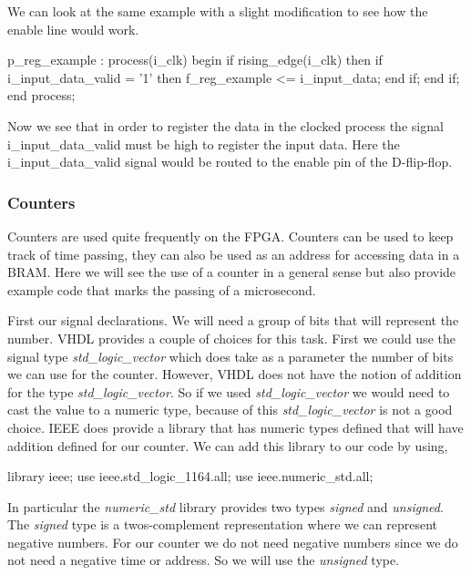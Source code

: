 We can look at the same example with a slight modification to see how the enable line would work.
	

\begin{VHDLlisting}[tabsize=4]
p_reg_example : process(i_clk)
begin
    if rising_edge(i_clk) then
        if i_input_data_valid = '1' then
            f_reg_example <= i_input_data;
        end if;
    end if;
end process;
\end{VHDLlisting}
	
Now we see that in order to register the data in the clocked process the signal i\_input\_data\_valid must be high to register the input data. Here the i\_input\_data\_valid signal would be routed to the enable pin of the D-flip-flop.
	
	
\subsubsection{Counters}
	
Counters are used quite frequently on the \ac{FPGA}. Counters can be used to keep track of time passing, they can also be used as an address for accessing data in a \ac{BRAM}. Here we will see the use of a counter in a general sense but also provide example code that marks the passing of a microsecond. 

First our signal declarations. We will need a group of bits that will represent the number. \ac{VHDL} provides a couple of choices for this task. First we could use the signal type \emph{std\_logic\_vector} which does take as a parameter the number of bits we can use for the counter. However, \ac{VHDL} does not have the notion of addition for the type \emph{std\_logic\_vector}. So if we used \emph{std\_logic\_vector} we would need to cast the value to a numeric type, because of this \emph{std\_logic\_vector} is not a good choice. \ac{IEEE} does provide a library that has numeric types defined that will have addition defined for our counter. We can add this library to our code by using, 

\begin{VHDLlisting}[tabsize=4]
library ieee;
	use ieee.std_logic_1164.all;
	use ieee.numeric_std.all;
\end{VHDLlisting}

In particular the \emph{numeric\_std} library provides two types \emph{signed} and \emph{unsigned}. The \emph{signed} type is a twos-complement representation where we can represent negative numbers. For our counter we do not need negative numbers since we do not need a negative time or address. So we will use the \emph{unsigned} type. 

